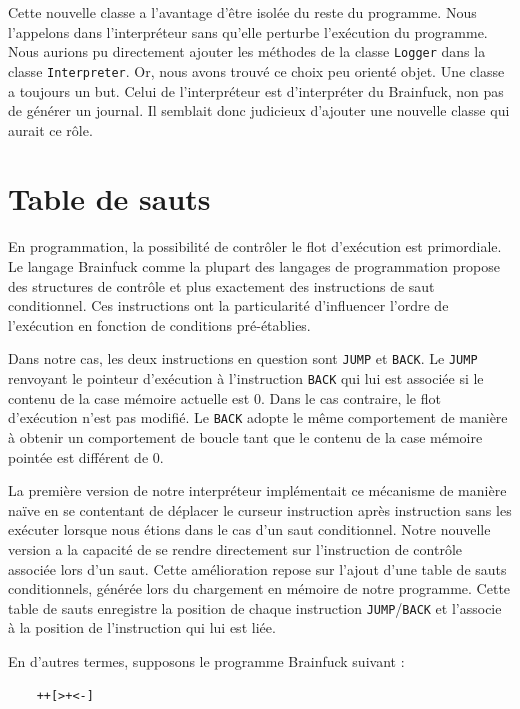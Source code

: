 \documentclass[titlepage]{article}
\begin{document}
    Cette nouvelle classe a l'avantage d’être isolée du reste du programme. Nous l’appelons dans l'interpréteur sans qu’elle perturbe l’exécution du programme. Nous aurions pu directement ajouter les méthodes de la classe \texttt{Logger} dans la classe \texttt{Interpreter}. Or, nous avons trouvé ce choix peu orienté objet. Une classe a toujours un but. Celui de l’interpréteur est d’interpréter du Brainfuck, non pas de générer un journal. Il semblait donc judicieux d’ajouter une nouvelle classe qui aurait ce rôle.


\section{Table de sauts}

    En programmation, la possibilité de contrôler le flot d'exécution est primordiale. Le langage Brainfuck comme la plupart des langages de programmation propose des structures de contrôle et plus exactement des instructions de saut conditionnel. Ces instructions ont la particularité d'influencer l'ordre de l'exécution en fonction de conditions pré-établies.


    Dans notre cas, les deux instructions en question sont \texttt{JUMP} et \texttt{BACK}. Le \texttt{JUMP} renvoyant le pointeur d'exécution à l'instruction \texttt{BACK} qui lui est associée si le contenu de la case mémoire actuelle est 0. Dans le cas contraire, le flot d'exécution n'est pas modifié. Le \texttt{BACK} adopte le même comportement de manière à obtenir un comportement de boucle tant que le contenu de la case mémoire pointée est différent de 0.


    La première version de notre interpréteur implémentait ce mécanisme de manière naïve en se contentant de déplacer le curseur instruction après instruction sans les exécuter lorsque nous étions dans le cas d'un saut conditionnel. Notre nouvelle version a la capacité de se rendre directement sur l'instruction de contrôle associée lors d'un saut. Cette amélioration repose sur l'ajout d'une table de sauts conditionnels, générée lors du chargement en mémoire de notre programme. Cette table de sauts enregistre la position de chaque instruction \texttt{JUMP}/\texttt{BACK} et l'associe à la position de l'instruction qui lui est liée.

    En d'autres termes, supposons le programme Brainfuck suivant :


 \begin{verbatim}
    ++[>+<-]
\end{verbatim}
\end{document}
